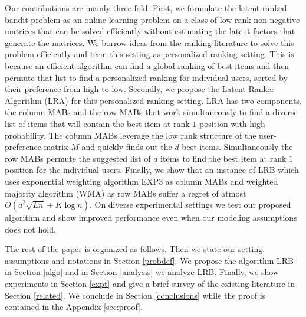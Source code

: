 Our contributions are mainly three fold. First, we formulate the latent ranked bandit problem as an online learning problem on a class of low-rank non-negative matrices that can be solved efficiently without estimating the latent factors that generate the matrices. We borrow ideas from the ranking literature to solve this problem efficiently and term this setting as personalized ranking setting. This is because an efficient algorithm can find a global ranking of best items and then permute that list to find a personalized ranking for individual users, sorted by their preference from high to low. Secondly, we propose the Latent Ranker Algorithm (LRA) for this personalized ranking setting. LRA has two components, the column MABs  and the row MABs that work simultaneously to find a diverse list of items that will contain the best item at rank $1$ position with high probability. The column MABs leverage the low rank structure of the user-preference matrix $M$ and quickly finds out the $d$ best items. Simultaneously the row MABs permute the suggested list of $d$ items to find the best item at rank $1$ position for the individual users. Finally, we show that an instance of LRB which uses exponential weighting algorithm EXP3 as column MABs and weighted majority algorithm (WMA) as row MABs suffer a regret of atmost $O\left(d^2\sqrt{L n} + K \log n\right)$. On diverse experimental settings we test our proposed algorithm and show improved performance even when our modeling assumptions does not hold.

	The rest of the paper is organized as follows. Then we state our setting, assumptions and notations in Section \ref{probdef}. We propose the algorithm LRB in Section \ref{algo} and in Section \ref{analysis} we analyze LRB. Finally, we show experiments in Section \ref{expt} and give a brief survey of the existing literature in Section \ref{related}. We conclude in Section \ref{conclusions} while the proof is contained in the Appendix \ref{sec:proof}.